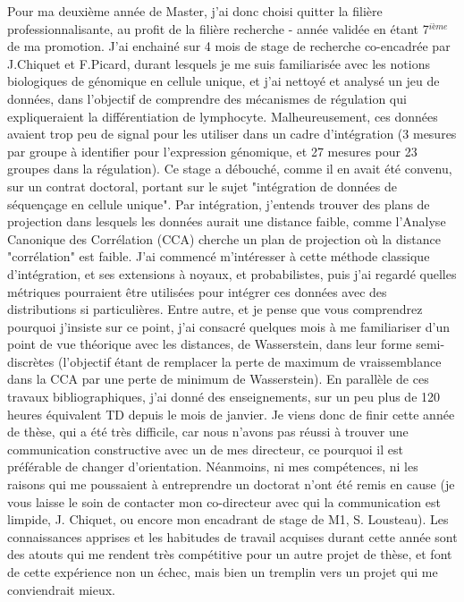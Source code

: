 \documentclass[a4paper,12pt]{article}
\begin{document}
Pour ma deuxième année de Master, j'ai donc choisi quitter la filière professionnalisante, au profit de la filière recherche - année validée en étant 7$^{ième}$ de ma promotion. 
J'ai enchainé sur 4 mois de stage de recherche co-encadrée par J.Chiquet et F.Picard, durant lesquels je me suis familiarisée avec les notions biologiques de génomique en cellule unique, et j'ai nettoyé et analysé un jeu de données, dans l'objectif de comprendre des mécanismes de régulation qui expliqueraient la différentiation de lymphocyte. Malheureusement, ces données avaient trop peu de signal pour les utiliser dans un cadre d'intégration (3 mesures par groupe à identifier pour l'expression génomique, et 27 mesures pour 23 groupes dans la régulation). Ce stage a débouché, comme il en avait été convenu, sur un contrat doctoral, portant sur le sujet "intégration de données de séquençage en cellule unique". 
Par intégration, j'entends trouver des plans de projection dans lesquels les données aurait une distance faible, comme l'Analyse Canonique des Corrélation (CCA) cherche un plan de projection où la distance "corrélation" est faible. J'ai commencé m'intéresser à cette méthode classique d'intégration, et ses extensions à noyaux, et probabilistes, puis j'ai regardé quelles métriques pourraient être utilisées pour intégrer ces données avec des distributions si particulières. Entre autre, et je pense que vous comprendrez pourquoi j'insiste sur ce point, j'ai consacré quelques mois à me familiariser d'un point de vue théorique avec les distances, de Wasserstein, dans leur forme semi-discrètes (l'objectif étant de remplacer la perte de maximum de vraissemblance dans la CCA par une perte de minimum de Wasserstein). En parallèle de ces travaux bibliographiques, j'ai donné des enseignements, sur un peu plus de 120 heures équivalent TD depuis le mois de janvier. 
Je viens donc de finir cette année de thèse, qui a été très difficile, car nous n'avons pas réussi à trouver une communication constructive avec un de mes directeur, ce pourquoi il est préférable de changer d'orientation.%
Néanmoins, ni mes compétences, ni les raisons qui me poussaient à entreprendre un doctorat n'ont été remis en cause (je vous laisse le soin de contacter mon co-directeur avec qui la communication est limpide, J. Chiquet, ou encore mon encadrant de stage de M1, S. Lousteau).
Les connaissances apprises et les habitudes de travail acquises durant cette année sont des atouts qui me rendent très compétitive pour un autre projet de thèse, et font de cette expérience non un échec, mais bien un tremplin vers un projet qui me conviendrait mieux.
\end{document}
